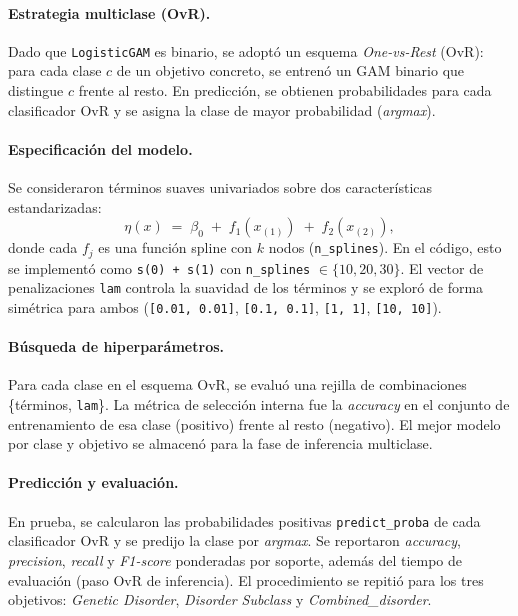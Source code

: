 \documentclass[11pt,a4paper,spanish]{book}
\numberwithin{equation}{chapter}
\numberwithin{figure}{chapter}
\begin{document}
\paragraph{Estrategia multiclase (OvR).}
Dado que \texttt{LogisticGAM} es binario, se adoptó un esquema \textit{One-vs-Rest} (OvR):
para cada clase $c$ de un objetivo concreto, se entrenó un GAM binario
que distingue $c$ frente al resto. En predicción, se obtienen probabilidades para cada clasificador
OvR y se asigna la clase de mayor probabilidad (\textit{argmax}).

\paragraph{Especificación del modelo.}
Se consideraron términos suaves univariados sobre dos características estandarizadas:
\[
\eta(x) \;=\; \beta_0 \;+\; f_1(x_{(1)}) \;+\; f_2(x_{(2)}),
\]
donde cada $f_j$ es una función spline con $k$ nodos (\texttt{n\_splines}).
En el código, esto se implementó como \texttt{s(0) + s(1)} con
\texttt{n\_splines} $\in \{10, 20, 30\}$.
El vector de penalizaciones \texttt{lam} controla la suavidad de los términos y se exploró de forma
simétrica para ambos (\texttt{[0.01, 0.01]}, \texttt{[0.1, 0.1]}, \texttt{[1, 1]}, \texttt{[10, 10]}).

\paragraph{Búsqueda de hiperparámetros.}
Para cada clase en el esquema OvR, se evaluó una rejilla de combinaciones
\{términos, \texttt{lam}\}. La métrica de selección interna fue la \textit{accuracy} en el conjunto
de entrenamiento de esa clase (positivo) frente al resto (negativo). El mejor modelo por clase
y objetivo se almacenó para la fase de inferencia multiclase.

\paragraph{Predicción y evaluación.}
En prueba, se calcularon las probabilidades positivas \texttt{predict\_proba} de cada clasificador OvR
y se predijo la clase por \textit{argmax}. Se reportaron \textit{accuracy}, \textit{precision},
\textit{recall} y \textit{F1-score} ponderadas por soporte, además del tiempo de evaluación
(paso OvR de inferencia). El procedimiento se repitió para los tres objetivos:
\textit{Genetic Disorder}, \textit{Disorder Subclass} y \textit{Combined\_disorder}.
\end{document}
